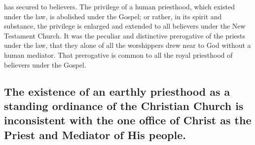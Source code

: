 \documentclass[]{book}
\begin{document}
has secured to believers. The privilege of a human priesthood, which existed under the law, is abolished under the Gospel; or rather, in its spirit and substance, the privilege is enlarged and extended to all believers under the New Testament Church. It was the peculiar and distinctive prerogative of the priests under the law, that they alone of all the worshippers drew near to God without a human mediator. That prerogative is common to all the royal priesthood of believers under the Gospel.

\hypertarget{the-existence-of-an-earthly-priesthood-as-a-standing-ordinance-of-the-christian-church-is-inconsistent-with-the-one-office-of-christ-as-the-priest-and-mediator-of-his-people.}{%
\subsection{The existence of an earthly priesthood as a standing ordinance of the Christian Church is inconsistent with the one office of Christ as the Priest and Mediator of His people.}\label{the-existence-of-an-earthly-priesthood-as-a-standing-ordinance-of-the-christian-church-is-inconsistent-with-the-one-office-of-christ-as-the-priest-and-mediator-of-his-people.}}
\end{document}
